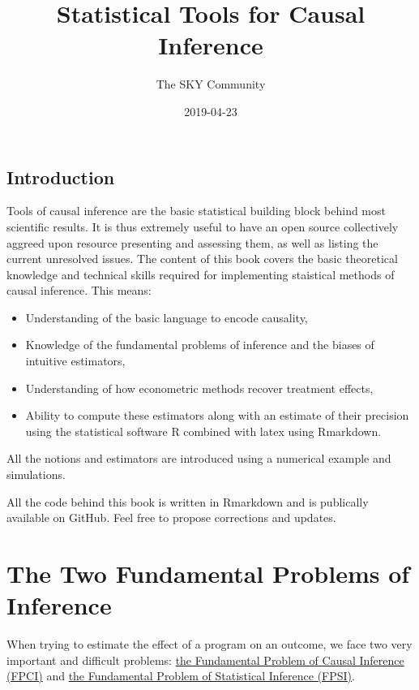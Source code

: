 \documentclass[]{book}
\title{Statistical Tools for Causal Inference}
\author{The SKY Community}
\date{2019-04-23}
\providecommand{\tightlist}{%
  \setlength{\itemsep}{0pt}\setlength{\parskip}{0pt}}
\theoremstyle{definition}
\theoremstyle{definition}
\theoremstyle{definition}
\theoremstyle{remark}
\begin{document}
\maketitle

{
\setcounter{tocdepth}{1}
\tableofcontents
}
\chapter*{Introduction}\label{introduction}

Tools of causal inference are the basic statistical building block
behind most scientific results. It is thus extremely useful to have an
open source collectively aggreed upon resource presenting and assessing
them, as well as listing the current unresolved issues. The content of
this book covers the basic theoretical knowledge and technical skills
required for implementing staistical methods of causal inference. This
means:

\begin{itemize}
\tightlist
\item
  Understanding of the basic language to encode causality,
\item
  Knowledge of the fundamental problems of inference and the biases of
  intuitive estimators,
\item
  Understanding of how econometric methods recover treatment effects,
\item
  Ability to compute these estimators along with an estimate of their
  precision using the statistical software R combined with latex using
  Rmarkdown.
\end{itemize}

All the notions and estimators are introduced using a numerical example
and simulations.

All the code behind this book is written in Rmarkdown and is publically
available on GitHub. Feel free to propose corrections and updates.

\part{The Two Fundamental Problems of
Inference}\label{part-the-two-fundamental-problems-of-inference}

When trying to estimate the effect of a program on an outcome, we face
two very important and difficult problems: \href{FPCI.html}{the
Fundamental Problem of Causal Inference (FPCI)} and \href{FPSI.html}{the
Fundamental Problem of Statistical Inference (FPSI)}.
\end{document}
